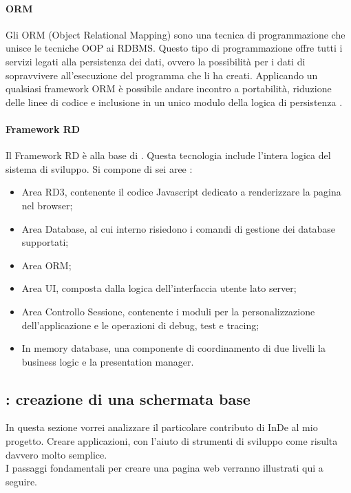 \paragraph{ORM}\label{ORM}
Gli ORM (Object Relational Mapping) sono una tecnica di programmazione che unisce le tecniche OOP ai RDBMS. Questo tipo di programmazione offre tutti i servizi legati alla persistenza dei dati, ovvero la possibilità per i dati di sopravvivere all'esecuzione del programma che li ha creati. Applicando un qualsiasi framework ORM è possibile andare incontro a portabilità, riduzione delle linee di codice e inclusione in un unico modulo della logica di persistenza \hyperref[bib14]{\cite{[14]}}.

\paragraph{Framework RD}
Il Framework RD è alla base di \inde. Questa tecnologia include l'intera logica del sistema di sviluppo. Si compone di sei aree \hyperref[bib11]{\cite{[11]}}:
\begin{itemize}
	\item Area RD3, contenente il codice Javascript dedicato a renderizzare la pagina nel browser;
	\item Area Database, al cui interno risiedono i comandi di gestione dei database supportati;
	\item Area ORM;
	\item Area UI, composta dalla logica dell'interfaccia utente lato server; 
	\item Area Controllo Sessione, contenente i moduli per la personalizzazione dell'applicazione e le operazioni di debug, test e tracing;
	\item In memory database, una componente di coordinamento di due livelli la business logic e la presentation manager.
\end{itemize}


\subsection{\inde: creazione di una schermata base}
In questa sezione vorrei analizzare il particolare contributo di InDe al mio progetto. Creare applicazioni, con l'aiuto di strumenti di sviluppo come \inde risulta davvero molto semplice.
\\

I passaggi fondamentali per creare una pagina web verranno illustrati qui a seguire.

